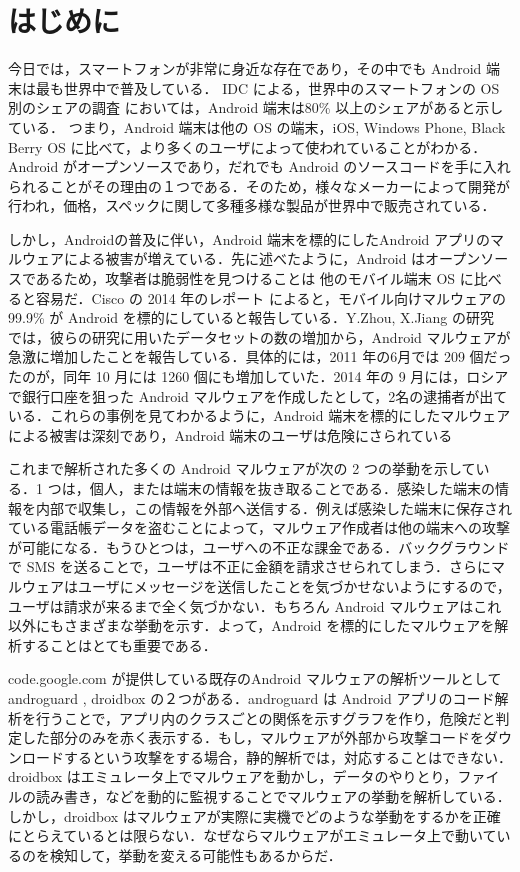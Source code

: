 \section{はじめに}
\label{sec:intro}
今日では，スマートフォンが非常に身近な存在であり，その中でも Android 端末は最も世界中で普及している． IDC による，世界中のスマートフォンの OS 別のシェアの調査 \cite{osshare} においては，Android 端末は80\% 以上のシェアがあると示している． つまり，Android 端末は他の OS の端末，iOS, Windows Phone, Black Berry OS に比べて，より多くのユーザによって使われていることがわかる．Android がオープンソースであり，だれでも Android のソースコードを手に入れられることがその理由の１つである．そのため，様々なメーカーによって開発が行われ，価格，スペックに関して多種多様な製品が世界中で販売されている．

しかし，Androidの普及に伴い，Android 端末を標的にしたAndroid アプリのマルウェアによる被害が増えている．先に述べたように，Android はオープンソースであるため，攻撃者は脆弱性を見つけることは 他のモバイル端末 OS に比べると容易だ．Cisco の 2014 年のレポート \cite{cisco} によると，モバイル向けマルウェアの 99.9\% が Android を標的にしていると報告している．Y.Zhou, X.Jiang の研究 \cite{dissect} では，彼らの研究に用いたデータセットの数の増加から，Android マルウェアが急激に増加したことを報告している．具体的には，2011 年の6月では 209 個だったのが，同年 10 月には 1260 個にも増加していた．2014 年の 9 月には，ロシアで銀行口座を狙った Android マルウェアを作成したとして，2名の逮捕者が出ている．これらの事例を見てわかるように，Android 端末を標的にしたマルウェアによる被害は深刻であり，Android 端末のユーザは危険にさられている

これまで解析された多くの Android マルウェアが次の 2 つの挙動を示している．1 つは，個人，または端末の情報を抜き取ることである．感染した端末の情報を内部で収集し，この情報を外部へ送信する．例えば感染した端末に保存されている電話帳データを盗むことによって，マルウェア作成者は他の端末への攻撃が可能になる．もうひとつは，ユーザへの不正な課金である．バックグラウンドで SMS を送ることで，ユーザは不正に金額を請求させられてしまう．さらにマルウェアはユーザにメッセージを送信したことを気づかせないようにするので，ユーザは請求が来るまで全く気づかない．もちろん Android マルウェアはこれ以外にもさまざまな挙動を示す．よって，Android を標的にしたマルウェアを解析することはとても重要である．

code.google.com が提供している既存のAndroid マルウェアの解析ツールとして androguard \cite{aguard} , droidbox \cite{dbox} の２つがある．androguard は Android アプリのコード解析を行うことで，アプリ内のクラスごとの関係を示すグラフを作り，危険だと判定した部分のみを赤く表示する．もし，マルウェアが外部から攻撃コードをダウンロードするという攻撃をする場合，静的解析では，対応することはできない．droidbox はエミュレータ上でマルウェアを動かし，データのやりとり，ファイルの読み書き，などを動的に監視することでマルウェアの挙動を解析している．しかし，droidbox はマルウェアが実際に実機でどのような挙動をするかを正確にとらえているとは限らない．なぜならマルウェアがエミュレータ上で動いているのを検知して，挙動を変える可能性もあるからだ．

